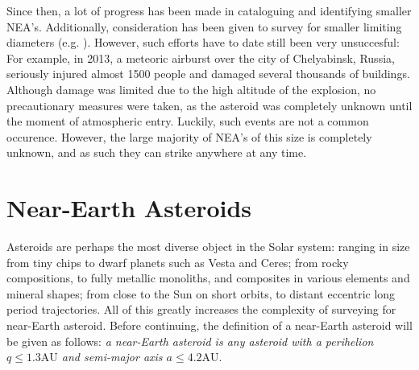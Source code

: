 Since then, a lot of progress has been made in cataloguing and identifying smaller NEA's. Additionally, consideration has been given to survey for smaller limiting diameters (e.g. \cite{2003NEOSDT}). However, such efforts have to date still been very unsuccesful: For example, in 2013, a meteoric airburst over the city of Chelyabinsk, Russia, seriously injured almost 1500 people and damaged several thousands of buildings. Although damage was limited due to the high altitude of the explosion, no precautionary measures were taken, as the asteroid was completely unknown until the moment of atmospheric entry. Luckily, such events are not a common occurence. However, the large majority of NEA's of this size is completely unknown, and as such they can strike anywhere at any time. 

\section{Near-Earth Asteroids}
\label{sec:introduction_NEA}
Asteroids are perhaps the most diverse object in the Solar system: ranging in size from tiny chips to dwarf planets such as Vesta and Ceres; from rocky compositions, to fully metallic monoliths, and composites in various elements and mineral shapes; from close to the Sun on short orbits, to distant eccentric long period trajectories. All of this greatly increases the complexity of surveying for near-Earth asteroid. Before continuing, the definition of a near-Earth asteroid will be given as follows: \textit{a near-Earth asteroid is any asteroid with a perihelion $q \leq 1.3 \mathrm{AU}$ and semi-major axis $a \leq 4.2 \mathrm{AU}$}. \\


